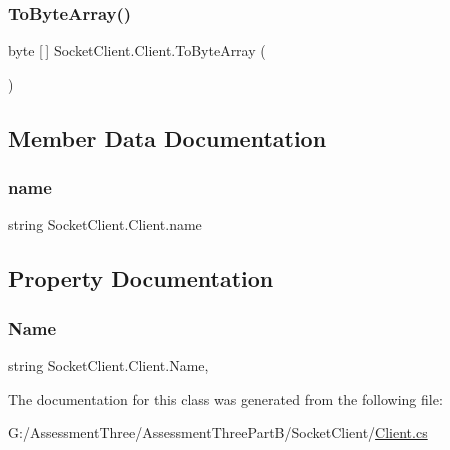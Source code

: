 \subsubsection{\texorpdfstring{To\+Byte\+Array()}{ToByteArray()}}
{\footnotesize\ttfamily byte \mbox{[}$\,$\mbox{]} Socket\+Client.\+Client.\+To\+Byte\+Array (\begin{DoxyParamCaption}{ }\end{DoxyParamCaption})\hspace{0.3cm}{\ttfamily [inline]}}



\subsection{Member Data Documentation}
\mbox{\label{class_socket_client_1_1_client_a162db8b8ce5e35c270876f905b71c8b8}} 
\subsubsection{\texorpdfstring{name}{name}}
{\footnotesize\ttfamily string Socket\+Client.\+Client.\+name\hspace{0.3cm}{\ttfamily [private]}}



\subsection{Property Documentation}
\mbox{\label{class_socket_client_1_1_client_a5eb03ddd11665bcd18f05f970433ec1b}} 
\subsubsection{\texorpdfstring{Name}{Name}}
{\footnotesize\ttfamily string Socket\+Client.\+Client.\+Name\hspace{0.3cm}{\ttfamily [get]}, {\ttfamily [set]}}



The documentation for this class was generated from the following file\+:\begin{DoxyCompactItemize}
\item 
G\+:/\+Assessment\+Three/\+Assessment\+Three\+Part\+B/\+Socket\+Client/\hyperlink{_socket_client_2_client_8cs}{Client.\+cs}\end{DoxyCompactItemize}
